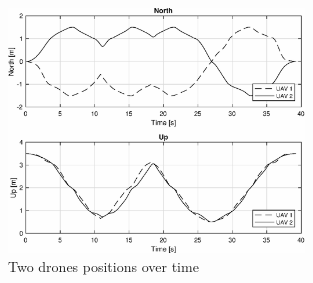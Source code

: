 \begin{figure}
\centering
\includegraphics[width=0.7\textwidth]{chapters/chapter-04/figures/overlapped_2.eps}
\caption{Two drones positions over time}
\label{fig:overlapped_2}
\end{figure}
